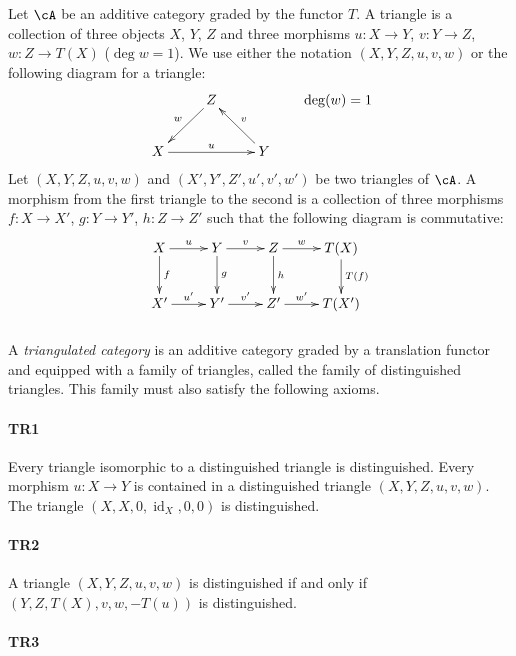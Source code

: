 Let $\cA$ be an additive category graded by the functor $T$. A triangle is
a collection of three objects $X$, $Y$, $Z$ and three morphisms
$u:X\to Y$, $v:Y\to Z$, $w:Z\to T(X)$ ($\deg w=1$). We use either the
notation $(X,Y,Z,u,v,w)$ or the following diagram for a triangle:
\[\xymatrix{
  & Z \ar[dl]_-w \\
  X \ar[rr]^-u
    & & Y \ar[lu]_-v
}\qquad \deg(w)=1
\]
Let $(X,Y,Z,u,v,w)$ and $(X',Y',Z',u',v',w')$ be two triangles of $\cA$.
A morphism from the first triangle to the second is a collection of three
morphisms $f:X\to X'$, $g:Y\to Y'$, $h:Z\to Z'$ such that the following
diagram is commutative:
\[\xymatrix{
  X \ar[r]^-u \ar[d]^-f
    & Y \ar[r]^-v \ar[d]^-g
    & Z \ar[r]^-w \ar[d]^-h
    & T(X) \ar[d]^-{T(f)} \\
  X' \ar[r]^-{u'}
    & Y' \ar[r]^-{v'}
    & Z' \ar[r]^-{w'}
    & T(X')
}\]

\subsubsection{}\label{VIII:1-1-1}

A \emph{triangulated category} is an additive category graded by a
translation functor and equipped with a family of triangles, called the
family of distinguished triangles. This family must also satisfy the
following axioms.

\paragraph{TR1}
\hypertarget{VIII:TR1}{}

Every triangle isomorphic to a distinguished triangle is distinguished.
Every morphism $u:X\to Y$ is contained in a distinguished triangle
$(X,Y,Z,u,v,w)$. The triangle
$(X,X,0,\operatorname{id}_X,0,0)$ is distinguished.

\paragraph{TR2}
\hypertarget{VIII:TR2}{}

A triangle $(X,Y,Z,u,v,w)$ is distinguished if and only if
$(Y,Z,T(X),v,w,-T(u))$ is distinguished.

\paragraph{TR3}
\hypertarget{VIII:TR3}{}

